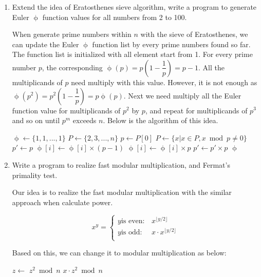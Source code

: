 \documentclass[UTF8]{article}
\begin{document}
\begin{enumerate}
\item{Extend the idea of Eratosthenes sieve algorithm, write a program to generate Euler $\upphi$ function values for all numbers from 2 to 100.}

When generate prime numbers within $n$ with the sieve of Eratosthenes, we can update the Euler $\upphi$ function list by every prime numbers found so far. The function list is initialized with all element start from 1. For every prime number $p$, the corresponding $\upphi(p) = p(1 - \dfrac{1}{p}) = p - 1$. All the multiplicands of $p$ need multiply with this value. However, it is not enough as $\upphi(p^2) = p^2(1 - \dfrac{1}{p}) = p \upphi(p)$. Next we need multiply all the Euler function value for multiplicands of $p^2$ by $p$, and repeat for multiplicands of $p^3$ and so on until $p^m$ exceeds $n$. Below is the algorithm of this idea.

\begin{algorithmic}
  \State $\upphi \gets \{1, 1, ..., 1\}$ 
  \State $P \gets \{2, 3, ..., n\}$ 
    \State $p \gets P[0]$
    \State $P \gets \{x | x \in P, x \bmod p \neq 0\}$
    \State $p' \gets p$
    \Repeat
          \State $\upphi[i] \gets \upphi[i] \times (p - 1)$
        \Else
          \State $\upphi[i] \gets \upphi[i] \times p$
        \EndIf
      \EndFor
      \State $p' \gets p' \times p$
  \EndWhile
  \State \Return $\upphi$
\EndFunction
\end{algorithmic}

\item {Write a program to realize fast modular multiplication, and Fermat's primality test.}

Our idea is to realize the fast modular multiplication with the similar approach when calculate power.

\[
x^y =
\begin{cases}
y \text{is even}: & x^{\lfloor y / 2 \rfloor} \\
y \text{is odd}: & x \cdot x^{\lfloor y / 2 \rfloor} \\
\end{cases}
\]

Based on this, we can change it to modular multiplication as below:

\begin{algorithmic}
    \State {}
  \EndIf
  \State $z \gets$ 
    \State \Return $z^2 \bmod n$
  \Else
    \State \Return $x \cdot z^2 \bmod n$
  \EndIf
\EndFunction
\end{algorithmic}


\end{enumerate}
\end{document}
